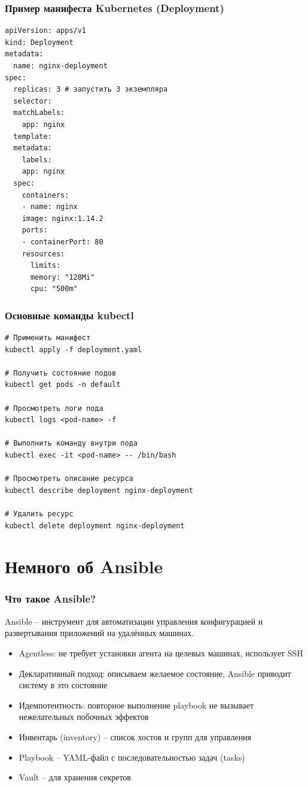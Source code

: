 \documentclass{beamer}
\begin{document}
\begin{frame}[fragile]
\frametitle{Пример манифеста Kubernetes (Deployment)}

\begin{verbatim}
apiVersion: apps/v1
kind: Deployment
metadata:
  name: nginx-deployment
spec:
  replicas: 3 # запустить 3 экземпляра
  selector:
  matchLabels:
    app: nginx
  template:
  metadata:
    labels:
    app: nginx
  spec:
    containers:
    - name: nginx
    image: nginx:1.14.2
    ports:
    - containerPort: 80
    resources:
      limits:
      memory: "128Mi"
      cpu: "500m"
\end{verbatim}

\end{frame}

\begin{frame}[fragile]
\frametitle{Основные команды kubectl}

\begin{verbatim}
# Применить манифест
kubectl apply -f deployment.yaml

# Получить состояние подов
kubectl get pods -n default

# Просмотреть логи пода
kubectl logs <pod-name> -f

# Выполнить команду внутри пода
kubectl exec -it <pod-name> -- /bin/bash

# Просмотреть описание ресурса
kubectl describe deployment nginx-deployment

# Удалить ресурс
kubectl delete deployment nginx-deployment
\end{verbatim}

\end{frame}

\section{Немного об Ansible}

\begin{frame}
\frametitle{Что такое Ansible?}

Ansible – инструмент для автоматизации управления конфигурацией и развертывания приложений на удалённых машинах.

\begin{itemize}
  \item Agentless: не требует установки агента на целевых машинах, использует SSH
  \item Декларативный подход: описываем желаемое состояние, Ansible приводит систему в это состояние
  \item Идемпотентность: повторное выполнение playbook не вызывает нежелательных побочных эффектов
  \item Инвентарь (inventory) – список хостов и групп для управления
  \item Playbook – YAML-файл с последовательностью задач (tasks)
  \item Vault – для хранения секретов
\end{itemize}

\end{frame}
\end{document}

